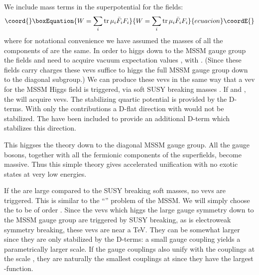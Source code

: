 \documentclass[a4paper,prl,twocolumn]{revtex4}
\providecommand{\tr}{\operatorname{tr}}
\begin{document}
We include mass terms in the
superpotential for the \coordHE{} fields:
\begin{equation}\coord{}\boxEquation{
  \label{eq:7}
  W = \sum_i \tr \mu_i {\bar F}_i F_i
}{
  W = \sum_i \tr \mu_i {\bar F}_i F_i
}{ecuacion}\coordE{}\end{equation}
where for notational convenience we have assumed the masses of all the
components of \coordHE{} are the same. 
In order to higgs down to the MSSM gauge group the fields \coordHE{} and
\coordHE{} need to acquire vacuum expectation values \coordHE{}, \coordHE{} with
\coordHE{}.  (Since these fields carry \coordHE{} charges
these vevs suffice to higgs the full MSSM gauge group down to the
diagonal subgroup.)  We can produce these vevs in the same way that a
vev for the MSSM Higgs field is triggered, via soft SUSY breaking
masses \coordHE{}.  If \coordHE{}
and \coordHE{}, the \coordHE{} will acquire
vevs. The stabilizing quartic potential is provided by the D-terms.
With only the \coordHE{} contributions a
D-flat direction with \coordHE{} would not be
stabilized. The \coordHE{} 
have been included to provide an additional D-term which stabilizes
this direction. 

This higgses the theory down to the diagonal MSSM gauge group.
All the \coordHE{} gauge bosons, together with all the fermionic
components of the \coordHE{} superfields, become massive.  Thus
this simple theory gives accelerated unification with no exotic states
at very low energies.  

If the  \coordHE{} are  large compared to the SUSY breaking soft masses,
no vevs are triggered. This is similar to the ``\myHighlight{$\mu$}\coordHE{}'' problem of the
MSSM. We will simply choose the \coordHE{} to be of order \coordHE{}.
Since the vevs which higgs the large gauge symmetry down to the MSSM
gauge group are triggered by SUSY breaking, as is electroweak symmetry
breaking, these vevs are near a TeV. They can be somewhat
larger since they are only stabilized by the \coordHE{} D-terms: a small
\coordHE{} gauge coupling yields a parametrically larger scale.
If the \coordHE{} gauge couplings also unify with the \coordHE{}
couplings at the scale \coordHE{}, they are naturally the smallest
couplings at \coordHE{} since they have the largest \myHighlight{$\beta$}\coordHE{}-function.
\end{document}
